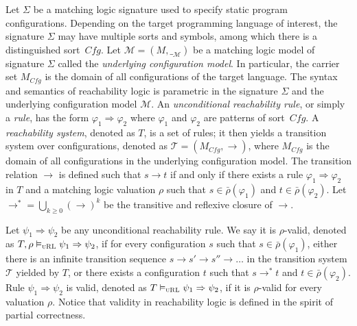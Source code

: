 \documentclass[letter,12pt]{article}
\newcommand{\To}{\Rightarrow}
\newcommand{\sig}{{\Sigma}}
\newcommand{\MM}{\mathcal{M}}
\newcommand{\interp}[1]{\__{#1}}
\newcommand{\interpM}{\interp{\MM}}
\newcommand{\barrho}{\bar{\rho}}
\newcommand{\uRL}{\textsc{uRL}}
\newcommand{\Cfg}{\mathit{Cfg}}
\newcommand{\TT}{\mathcal{T}}
\begin{document}
Let $\sig$ be a matching logic signature 
used to specify static program configurations.
Depending on the target programming language of interest,
the signature $\sig$
may have multiple sorts and symbols, among which there is 
a distinguished sort~$\Cfg$.
Let $\MM = (M, \interpM)$ be a matching logic model of signature $\sig$
called the \emph{underlying configuration model}.
In particular, the carrier set $M_\Cfg$ is the domain of all configurations
of the target language.
The syntax and semantics of reachability logic is parametric in
the signature $\sig$ and the underlying configuration model $\MM$.
An \emph{unconditional reachability rule}, or simply a \emph{rule}, has the form
$\varphi_1 \To \varphi_2$ where $\varphi_1$ and $\varphi_2$ are 
patterns of sort~$\Cfg$.
A \emph{reachability system}, denoted as $T$, is a set of rules;
it then yields a transition system over configurations,
denoted as $\TT = (M_\Cfg, \to)$,
where $M_\Cfg$ is the domain of all configurations in the
underlying configuration model.
The transition relation $\to$ is defined such that
$s \to t$ if and only if
there exists a rule $\varphi_1 \To \varphi_2$ in $T$
and a matching logic valuation $\rho$ such that
$s \in \barrho(\varphi_1)$ and $t \in \barrho(\varphi_2)$.
Let $\to^* = \bigcup_{k \ge 0} (\to)^k$ 
be the transitive and reflexive closure of ${\to}$.

Let $\psi_1 \To \psi_2$ be any unconditional reachability rule.
We say it is $\rho$-valid,
denoted as 
$T,\rho \vDash_\uRL \psi_1 \To \psi_2$,
if for every configuration $s$ such that $s \in \barrho(\varphi_1)$,
either there is an infinite transition sequence
$s \to s' \to s'' \to \dots$ in the transition system $\TT$ yielded by $T$,
or there exists a configuration $t$
such that $s \to^* t$ and $t \in \barrho(\varphi_2)$.
Rule $\psi_1 \To \psi_2$ is valid, denoted as $T \vDash_\uRL \psi_1 \To \psi_2$,
if it is $\rho$-valid for every valuation $\rho$.
Notice that validity in reachability logic is defined
in the spirit of partial correctness.
\end{document}
